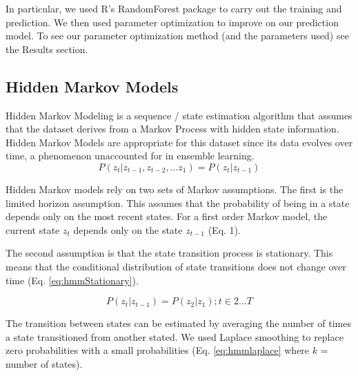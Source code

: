 \documentclass[twoside]{article}
\begin{document}
\begin{multicols}{2}
In particular, we used R's RandomForest package to carry out the training and prediction. We then used parameter optimization to improve on our prediction model. To see our parameter optimization method (and the parameters used) see the Results section.

\subsection{Hidden Markov Models}
Hidden Markov Modeling is a sequence / state estimation algorithm that assumes that the dataset derives from a Markov Process with hidden state information. Hidden Markov Models are appropriate for this dataset since its data evolves over time, a phenomenon unaccounted for in ensemble learning.
\vspace{-1mm}
\begin{equation}
P(z_{t}|z_{t-1},z_{t-2},...z_{1})=P(z_{t}|z_{t-1})
\label{eq:hmmLimited}
\end{equation}

Hidden Markov models rely on two sets of Markov assumptions. The first is the limited horizon assumption. This assumes that the probability of being in a state depends only on the most recent states. For a first order Markov model, the current state \begin{math}z_{t}\end{math} depends only on the state \begin{math}z_{t-1}\end{math} (Eq. 1).

The second assumption is that the state transition process is stationary. This means that the conditional distribution of state transitions does not change over time (Eq. \ref{eq:hmmStationary}).

\vspace{-1mm}

\begin{equation}
P(z_{t}|z_{t-1}) = P(z_{2}|z_{1});t\in 2...T
\label{eq:hmmStationary}
\end{equation}


The transition between states can be estimated by averaging the number of times a state transitioned from another stated. We used Laplace smoothing to replace zero probabilities with a small probabilities (Eq. \ref{eq:hmmlaplace} where \begin{math}k\end{math} = number of states).

\vspace{-1mm}


\end{multicols}
\end{document}

